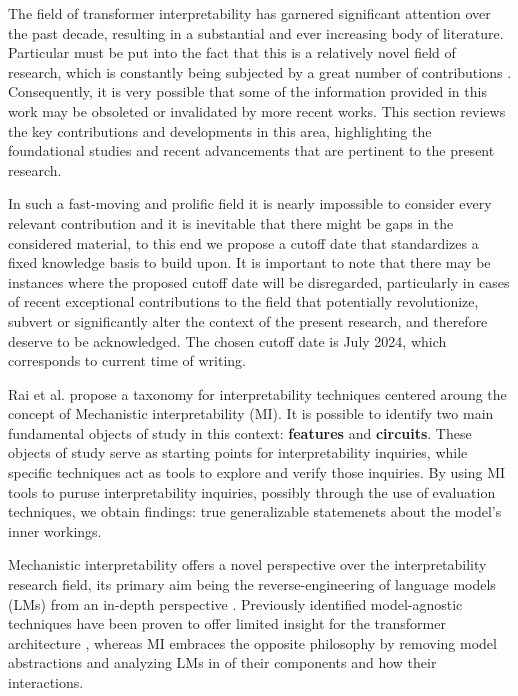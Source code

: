 The field of transformer interpretability has garnered significant attention over the past decade, resulting in a substantial and ever increasing body of literature.
Particular  must be put into the fact that this is a relatively novel field of research, which is constantly being subjected by a great number of contributions .
Consequently, it is very possible that some of the information provided in this work may be obsoleted or invalidated by more recent works.
This section reviews the key contributions and developments in this area, highlighting the foundational studies and recent advancements that are pertinent to the present research.

In such a fast-moving and prolific field it is nearly impossible to consider every relevant contribution and it is inevitable that there might be gaps in the considered material, to this end we propose a cutoff date that standardizes a fixed knowledge basis to build upon.
It is important to note that there may be instances where the proposed cutoff date will be disregarded, particularly in cases of recent exceptional contributions to the field that potentially revolutionize, subvert or significantly alter the context of the present research, and therefore deserve to be acknowledged.
The chosen cutoff date is July 2024, which corresponds to current time of writing.

Rai et al. \cite{rai2024} propose a taxonomy for interpretability techniques centered aroung the concept of Mechanistic interpretability (MI).
It is possible to identify two main fundamental objects of study in this context: \textbf{features} and \textbf{circuits}.
These objects of study serve as starting points for interpretability inquiries, while specific techniques act as tools to explore and verify those inquiries.
By using MI tools to puruse interpretability inquiries, possibly through the use of evaluation techniques, we obtain findings: true generalizable statemenets about the model's inner workings.

Mechanistic interpretability offers a novel perspective over the interpretability research field, its primary aim being the reverse-engineering of language models (LMs) from an in-depth perspective \cite{olah2022}.
Previously identified model-agnostic techniques have been proven to offer limited insight for the transformer architecture , whereas MI embraces the opposite philosophy by removing model abstractions and analyzing LMs in  of their components and how their interactions.

